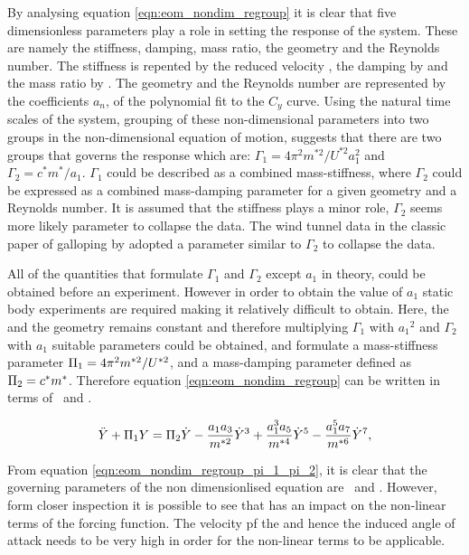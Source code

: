By analysing equation \ref{eqn:eom_nondim_regroup} it is clear that five dimensionless parameters play a role in setting the response of the system. These are namely the stiffness, damping, mass ratio, the geometry and the Reynolds number. The stiffness is repented by the reduced velocity \ustar, the damping by \cstar and the mass ratio by \mstar. The geometry and the Reynolds number are represented by the coefficients $a_n$, of the polynomial fit to the $C_y$ curve. Using the natural time scales of the system, grouping of these non-dimensional parameters into two groups in the non-dimensional equation of motion, suggests that there are two groups that governs the response which are: $\Gamma_1 = 4\pi^2m^{*2}/U^{*2}a_1^2$ and $\Gamma_2 = c^*m^*/a_1$. $\Gamma_1$ could be described as a combined mass-stiffness, where $\Gamma_2$ could be expressed as a combined mass-damping parameter for a given geometry and a Reynolds number. It is assumed that the stiffness plays a minor role, $\Gamma_2$ seems more likely parameter to collapse the data. The wind tunnel data in the classic paper of galloping by \citep{Parkinson1964} adopted a parameter similar to $\Gamma_2$ to collapse the data. 

All of the quantities that formulate $\Gamma_1$ and $\Gamma_2$ except $a_1$ in theory, could be obtained before an experiment. However in order to obtain the value of $a_1$ static body experiments are required making it relatively difficult to obtain. Here, the \reynoldsnumber and the geometry remains constant and therefore multiplying $\Gamma_1$ with ${a_1}^2$ and $\Gamma_2$ with $a_1$ suitable parameters could be obtained, and formulate a mass-stiffness parameter $\Pi_1 =  4\pi^2m^{*2}/U^{*2}$, and a mass-damping parameter defined as $\Pi_2 = c^*m^*$. Therefore equation \ref{eqn:eom_nondim_regroup} can be written in terms of \massstiff \ and \massdamp. 

  \begin{equation}
  \label{eqn:eom_nondim_regroup_pi_1_pi_2}
  \ddot{Y} + \Pi_1 Y = \Pi_2 \dot{Y} - \frac{a_1a_3}{m^{*2}}\dot{Y}^3 + \frac{a_1^3a_5}{m^{*4}}\dot{Y}^5 - \frac{a_1^5a_7}{m^{*6}}\dot{Y}^7,
  \end{equation} 
  
From equation \ref{eqn:eom_nondim_regroup_pi_1_pi_2}, it is clear that the governing parameters of the non dimensionlised equation are \massstiff \ \massdamp and \mstar. However, form closer inspection it is possible to see that \mstar has an impact on the non-linear terms of the forcing function. The velocity pf the and hence the induced angle of attack needs to be very high in order for the non-linear terms to be applicable. 

